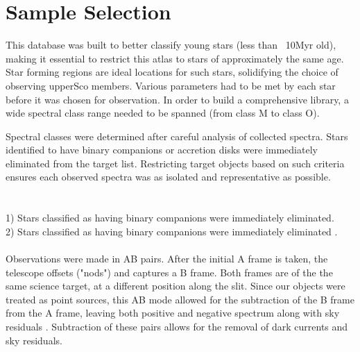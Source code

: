 \section{Sample Selection}

This database was built to better classify young stars (less than ~10Myr old), making it essential to restrict this atlas to stars of approximately the same age.  
Star forming regions are ideal locations for such stars, solidifying the choice of observing upperSco members.  Various parameters had to be met by each star before it was chosen for observation.  In order to build a comprehensive library, a wide spectral class range needed to be spanned (from class M to class O).  




Spectral classes were determined after careful analysis of collected spectra.  Stars identified to have binary companions \cite{binary_guy} or accretion disks \cite{binary_guy} were immediately eliminated from the target list.
Restricting target objects based on such criteria ensures each observed spectra was as isolated and representative as possible.
\\~\\
[UNSURE OF PROPER CITATION METHOD (1 OR 2 BELOW?):]\\
1) Stars classified as having binary companions\cite{binary_guy} were immediately eliminated.\\
2) Stars classified as having binary companions were immediately eliminated \cite{binary_guy}.
\\~\\



Observations were made in AB pairs.  After the initial A frame is taken, the telescope offsets ("nods") and captures a B frame.  Both frames are of the the same science target, at a different position along the slit.  Since our objects were treated as point sources, this AB mode allowed for the subtraction of the B frame from the A frame, leaving both positive and negative spectrum along with sky residuals \cite{Cushing_2004}. Subtraction of these pairs allows for the removal of dark currents and sky residuals.



